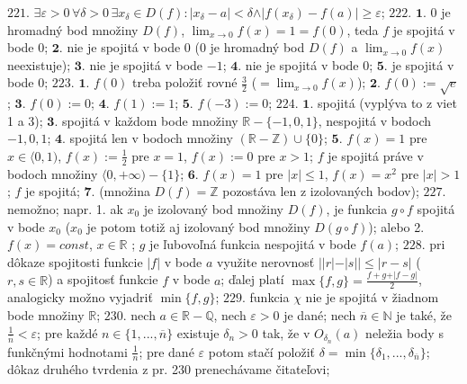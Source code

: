 $\boxed{221.}$ $\exists \varepsilon > 0 \, \forall \delta > 0 \, \exists  x_{\delta} \in D(f): \vert x_{\delta} -a \vert < \delta \land \vert f(x_{\delta}) - f(a) \vert \geq \varepsilon $;
$\boxed{222.}$ $\boldsymbol{1.}$ $0$ je hromadný bod množiny $D(f)$, $\lim_{x \to 0} f(x) = 1 = f(0)$, teda $f$ je spojitá v bode $0$;
$\boldsymbol{2.}$  nie je spojitá v bode $0$ ($0$  je hromadný bod $D(f)$  a   $\lim_{x \to 0} f(x) $ neexistuje);
$\boldsymbol{3.}$ nie je spojitá v bode $-1$;
$\boldsymbol{4.}$ nie je spojitá v bode $0$;
$\boldsymbol{5.}$ je spojitá v bode $0$;
$\boxed{223.}$ $\boldsymbol{1.}$ $f(0)$ treba položiť rovné $\frac{3}{2} $ ($= \lim_{x \to 0} f(x)$);
$\boldsymbol{2.}$ $f(0):=\sqrt{e}$;
$\boldsymbol{3.}$ $f(0):=0$;
$\boldsymbol{4.}$ $f(1):=1$;
$\boldsymbol{5.}$ $f(-3):=0$;
$\boxed{224.}$ $\boldsymbol{1.}$ spojitá (vyplýva to z viet 1 a 3);
$\boldsymbol{3.}$ spojitá  v každom bode množiny $\mathbb{R}- \lbrace -1,0,1 \rbrace $, nespojitá v bodoch $-1,0,1 $;
$\boldsymbol{4.}$ spojitá len  v bodoch množiny $(\mathbb{R}- \mathbb{Z}) \cup \lbrace 0 \rbrace $;
$\boldsymbol{5.}$ $f(x)=1$ pre $x \in \langle0,1)$, $f(x):=\frac{1}{2}$  pre $x =1$, $f(x):=0$  pre $x > 1$; $f$ je spojitá práve v bodoch množiny $\langle 0, +\infty) -\lbrace 1 \rbrace $;
$\boldsymbol{6.}$ $f(x)=1$ pre $ \vert x \vert \leq 1$, $f(x)=x^{2}$  pre $ \vert x \vert >1$; $f$ je spojitá;
$\boldsymbol{7.}$ (množina $D(f)= \mathbb{Z}$ pozostáva len z izolovaných bodov);
$\boxed{227.}$ nemožno; napr. 1. ak $x_{0}$ je izolovaný bod množiny $D(f)$, je funkcia $g\circ f $ spojitá v bode $x_{0}$ ($x_{0}$ je potom totiž aj izolovaný bod množiny  $D(g\circ f)$); alebo 2. $f(x)= const$, $x \in  \mathbb{R}$  ; $ g $ je ľubovoľná funkcia nespojitá v bode $ f(a)$;
$\boxed{228.}$ pri dôkaze spojitosti funkcie $\vert f \vert$ v bode $a$ využite nerovnosť $\vert \vert r \vert - \vert s \vert \vert \leq \vert r-s \vert$ ($r,s \in \mathbb{R}$) a spojitosť funkcie  $f$  v bode $a$; ďalej platí $\max \lbrace f,g \rbrace =\frac{f+g+\vert f-g\vert}{2}$, analogicky možno vyjadriť $\min \lbrace f,g \rbrace $;
$\boxed{229.}$ funkcia $\chi $ nie je spojitá v žiadnom bode  množiny $\mathbb{R}$;
$\boxed{230.}$ nech $a \in \mathbb{R} - \mathbb{Q} $, nech $\varepsilon  >0$ je dané; nech $\overline{n} \in \mathbb{N} $ je také, že $\frac{1}{\overline{n}}< \varepsilon $; pre každé $n \in \lbrace1,...,\overline{n} \rbrace $ existuje $\delta_{n}>0 $ tak, že v $O_{\delta_{n}}(a)$ neležia body s funkčnými hodnotami  $\frac{1}{n} $; pre dané  $\varepsilon $ potom stačí položiť  $\delta = \min \lbrace \delta_{1},...,\delta_{\overline{n}} \rbrace$; dôkaz druhého tvrdenia z pr. 230 prenechávame čitateľovi;
